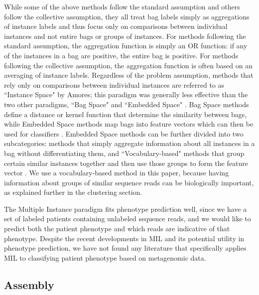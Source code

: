 While some of the above methods follow the standard assumption and others follow the collective assumption, they all treat bag labels simply as aggregations of instance labels and thus focus only on comparisons between individual instances and not entire bags or groups of instances. For methods following the standard assumption, the aggregation function is simply an OR function: if any of the instances in a bag are positive, the entire bag is positive. For methods following the collective assumption, the aggregation function is often based on an averaging of instance labels. Regardless of the problem assumption, methods that rely only on comparisons between individual instances are referred to as ``Instance Space" by Amores; this paradigm was generally  less effective than the two other paradigms, ``Bag Space" and ``Embedded Space" \cite{amores13}. Bag Space methods define a distance or kernel function that determine the similarity between bags, while Embedded Space methods map bags into feature vectors which can then be used for classifiers \cite{amores13}. Embedded Space methods can be further divided into two subcategories: methods that simply aggregate information about all instances in a bag without differentiating them, and ``Vocabulary-based" methods that group certain similar instances together and then use those groups to form the feature vector \cite{amores13}. We use a vocabulary-based method in this paper, because having information about groups of similar sequence reads can be biologically important, as explained further in the clustering section.

The Multiple Instance paradigm fits phenotype prediction well, since we have a set of labeled patients containing unlabeled sequence reads, and we would like to predict both the patient phenotype and which reads are indicative of that phenotype. Despite the recent developments in MIL and its potential utility in phenotype prediction, we have not found any literature that specifically applies MIL to classifying patient phenotype based on metagenomic data.

\subsection{Assembly}


